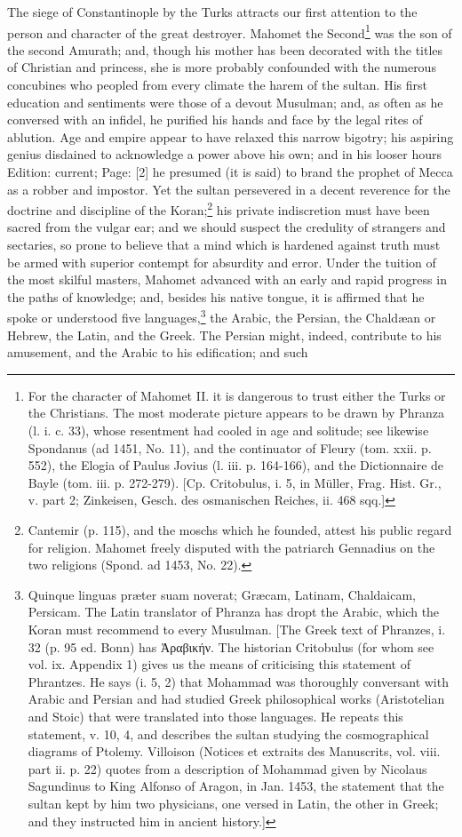 The siege of Constantinople by the Turks attracts our first attention to the person and character of the great destroyer. Mahomet the Second\footnote{For the character of Mahomet II. it is dangerous to trust either the Turks or the Christians. The most moderate picture appears to be drawn by Phranza (l. i. c. 33), whose resentment had cooled in age and solitude; see likewise Spondanus (ad 1451, No. 11), and the continuator of Fleury (tom. xxii. p. 552), the Elogia of Paulus Jovius (l. iii. p. 164-166), and the Dictionnaire de Bayle (tom. iii. p. 272-279). [Cp. Critobulus, i. 5, in Müller, Frag. Hist. Gr., v. part 2; Zinkeisen, Gesch. des osmanischen Reiches, ii. 468 sqq.]} was the son of the second Amurath; and, though his mother has been decorated with the titles of Christian and princess, she is more probably confounded with the numerous concubines who peopled from every climate the harem of the sultan. His first education and sentiments were those of a devout Musulman; and, as often as he conversed with an infidel, he purified his hands and face by the legal rites of ablution. Age and empire appear to have relaxed this narrow bigotry; his aspiring genius disdained to acknowledge a power above his own; and in his looser hours Edition: current; Page: [2] he presumed (it is said) to brand the prophet of Mecca as a robber and impostor. Yet the sultan persevered in a decent reverence for the doctrine and discipline of the Koran;\footnote{Cantemir (p. 115), and the moschs which he founded, attest his public regard for religion. Mahomet freely disputed with the patriarch Gennadius on the two religions (Spond. ad 1453, No. 22).} his private indiscretion must have been sacred from the vulgar ear; and we should suspect the credulity of strangers and sectaries, so prone to believe that a mind which is hardened against truth must be armed with superior contempt for absurdity and error. Under the tuition of the most skilful masters, Mahomet advanced with an early and rapid progress in the paths of knowledge; and, besides his native tongue, it is affirmed that he spoke or understood five languages,\footnote{Quinque linguas præter suam noverat; Græcam, Latinam, Chaldaicam, Persicam. The Latin translator of Phranza has dropt the Arabic, which the Koran must recommend to every Musulman. [The Greek text of Phranzes, i. 32 (p. 95 ed. Bonn) has \textgreek{\texthebrew{Ἀ}ραβικήν}. The historian Critobulus (for whom see vol. ix. Appendix 1) gives us the means of criticising this statement of Phrantzes. He says (i. 5, 2) that Mohammad was thoroughly conversant with Arabic and Persian and had studied Greek philosophical works (Aristotelian and Stoic) that were translated into those languages. He repeats this statement, v. 10, 4, and describes the sultan studying the cosmographical diagrams of Ptolemy. Villoison (Notices et extraits des Manuscrits, vol. viii. part ii. p. 22) quotes from a description of Mohammad given by Nicolaus Sagundinus to King Alfonso of Aragon, in Jan. 1453, the statement that the sultan kept by him two physicians, one versed in Latin, the other in Greek; and they instructed him in ancient history.]} the Arabic, the Persian, the Chaldæan or Hebrew, the Latin, and the Greek. The Persian might, indeed, contribute to his amusement, and the Arabic to his edification; and such 